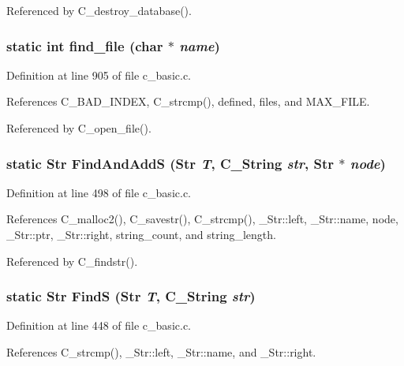 Referenced by C\_\-destroy\_\-database().
\subsubsection{\setlength{\rightskip}{0pt plus 5cm}static int find\_\-file (char $\ast$ {\em name})\hspace{0.3cm}{\tt  [static]}}\label{c__basic_8c_5b6ca0a0c3183131b0e1cd53a1982034}




Definition at line 905 of file c\_\-basic.c.

References C\_\-BAD\_\-INDEX, C\_\-strcmp(), defined, files, and MAX\_\-FILE.

Referenced by C\_\-open\_\-file().
\subsubsection{\setlength{\rightskip}{0pt plus 5cm}static \bf{Str} Find\-And\-Add\-S (\bf{Str} {\em T}, \bf{C\_\-String} {\em str}, \bf{Str} $\ast$ {\em node})\hspace{0.3cm}{\tt  [static]}}\label{c__basic_8c_d18925306330b6340494a12e7bd0b1a9}




Definition at line 498 of file c\_\-basic.c.

References C\_\-malloc2(), C\_\-savestr(), C\_\-strcmp(), \_\-Str::left, \_\-Str::name, node, \_\-Str::ptr, \_\-Str::right, string\_\-count, and string\_\-length.

Referenced by C\_\-findstr().
\subsubsection{\setlength{\rightskip}{0pt plus 5cm}static \bf{Str} Find\-S (\bf{Str} {\em T}, \bf{C\_\-String} {\em str})\hspace{0.3cm}{\tt  [static]}}\label{c__basic_8c_7e9d911903c774e5d01c4116b16bdb59}




Definition at line 448 of file c\_\-basic.c.

References C\_\-strcmp(), \_\-Str::left, \_\-Str::name, and \_\-Str::right.

